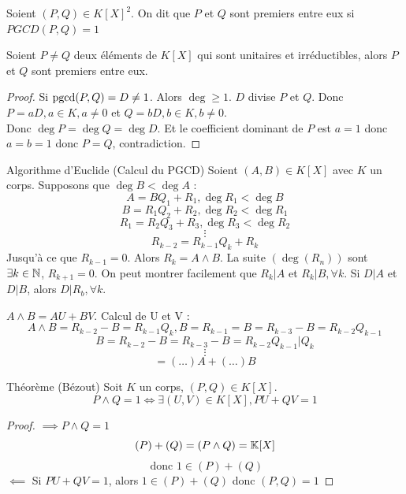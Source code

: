 \documentclass[]{report}
\begin{document}
    \begin{df}{}{}
        Soient $(P,Q)\in K[X]^2$. On dit que $P$ et $Q$ sont premiers entre eux si $PGCD(P,Q)=1$
    \end{df}

    \begin{prop}{}{}
        Soient $P\neq Q$ deux éléments de $K[X]$ qui sont unitaires et irréductibles, alors $P$ et $Q$ sont premiers entre eux.
    \end{prop}

    \begin{proof}
        Si $\text{pgcd}(P,Q)=D\neq 1$. Alors $\deg \ge 1$. $D$ divise $P$ et $Q$. Donc $P=aD,a\in K,a\neq 0$ et $Q=bD,b\in K,b\neq 0$.\\
        Donc $\deg P=\deg Q=\deg D$. Et le coefficient dominant de $P$ est $a=1$ donc $a=b=1$ donc $P=Q$, contradiction.
    \end{proof}

    \begin{prop}{Algorithme d'Euclide (Calcul du PGCD)}{}
        Soient $(A,B)\in K[X]$ avec $K$ un corps. Supposons que $\deg B< \deg A$ :
        $$A=BQ_1+R_1, \deg R_1<\deg B$$
        $$B=R_1Q_2+R_2, \deg R_2<\deg R_1$$
        $$R_1=R_2Q_3+R_3, \deg R_3<\deg R_2$$
        $$\vdots$$
        $$R_{k-2}=R_{k-1}Q_k+R_k$$
        Jusqu'à ce que $R_{k-1}=0$. Alors $R_k=A\wedge B$. La suite $(\deg(R_n))$ sont \tq $\exists k\in\mathbb{N}$, \tq $R_{k+1}=0$. On peut montrer facilement que $R_k|A$ et $R_k|B,\forall k$. Si $D|A$ et $D|B$, alors $D|R_b,\forall k$.
    \end{prop}

    \begin{re}{}{}
        $A\wedge B=AU+BV$. Calcul de U et V :$$A\wedge B=R_{k-2}-B=R_{k-1}Q_k, B=R_{k-1}=B=R_{k-3}-B=R_{k-2}Q_{k-1}$$
        $$B=R_{k-2}-B=R_{k-3}-B=R_{k-2}Q_{k-1}|Q_k$$
        $$\vdots$$
        $$=(\dots)A+(\dots)B$$
    \end{re}

    \begin{tm}{Théorème (Bézout)}{}
        Soit $K$ un corps, $(P,Q)\in K[X]$. $$P\wedge Q=1\iff \exists(U,V)\in K[X], PU+QV=1$$
    \end{tm}

    \begin{proof}
        $\implies P\wedge Q=1$
        \[(P)+(Q)=(P\wedge Q)=\mathbb{K} [X]\]
        \[\text{ donc }1\in (P)+(Q)\]
        $\impliedby$ Si $PU+QV=1$, alors $1\in (P)+(Q)$ donc $(P,Q)=1$
    \end{proof}
\end{document}
